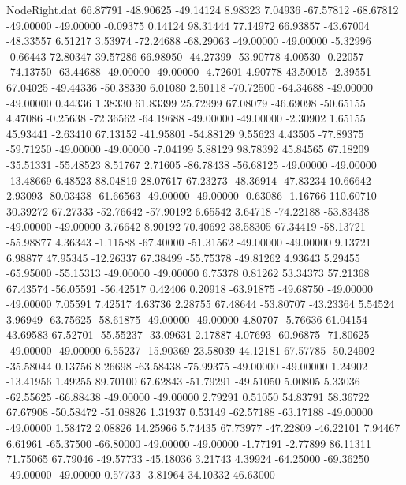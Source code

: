 \begin{filecontents}{NodeRight.dat}
  66.87791  -48.90625  -49.14124     8.98323    7.04936  -67.57812  -68.67812  -49.00000  -49.00000   -0.09375    0.14124   98.31444   77.14972
  66.93857  -43.67004  -48.33557     6.51217    3.53974  -72.24688  -68.29063  -49.00000  -49.00000   -5.32996   -0.66443   72.80347   39.57286
  66.98950  -44.27399  -53.90778     4.00530   -0.22057  -74.13750  -63.44688  -49.00000  -49.00000   -4.72601    4.90778   43.50015   -2.39551
  67.04025  -49.44336  -50.38330     6.01080    2.50118  -70.72500  -64.34688  -49.00000  -49.00000    0.44336    1.38330   61.83399   25.72999
  67.08079  -46.69098  -50.65155     4.47086   -0.25638  -72.36562  -64.19688  -49.00000  -49.00000   -2.30902    1.65155   45.93441   -2.63410
  67.13152  -41.95801  -54.88129     9.55623    4.43505  -77.89375  -59.71250  -49.00000  -49.00000   -7.04199    5.88129   98.78392   45.84565
  67.18209  -35.51331  -55.48523     8.51767    2.71605  -86.78438  -56.68125  -49.00000  -49.00000  -13.48669    6.48523   88.04819   28.07617
  67.23273  -48.36914  -47.83234    10.66642    2.93093  -80.03438  -61.66563  -49.00000  -49.00000   -0.63086   -1.16766  110.60710   30.39272
  67.27333  -52.76642  -57.90192     6.65542    3.64718  -74.22188  -53.83438  -49.00000  -49.00000    3.76642    8.90192   70.40692   38.58305
  67.34419  -58.13721  -55.98877     4.36343   -1.11588  -67.40000  -51.31562  -49.00000  -49.00000    9.13721    6.98877   47.95345  -12.26337
  67.38499  -55.75378  -49.81262     4.93643    5.29455  -65.95000  -55.15313  -49.00000  -49.00000    6.75378    0.81262   53.34373   57.21368
  67.43574  -56.05591  -56.42517     0.42406    0.20918  -63.91875  -49.68750  -49.00000  -49.00000    7.05591    7.42517    4.63736    2.28755
  67.48644  -53.80707  -43.23364     5.54524    3.96949  -63.75625  -58.61875  -49.00000  -49.00000    4.80707   -5.76636   61.04154   43.69583
  67.52701  -55.55237  -33.09631     2.17887    4.07693  -60.96875  -71.80625  -49.00000  -49.00000    6.55237  -15.90369   23.58039   44.12181
  67.57785  -50.24902  -35.58044     0.13756    8.26698  -63.58438  -75.99375  -49.00000  -49.00000    1.24902  -13.41956    1.49255   89.70100
  67.62843  -51.79291  -49.51050     5.00805    5.33036  -62.55625  -66.88438  -49.00000  -49.00000    2.79291    0.51050   54.83791   58.36722
  67.67908  -50.58472  -51.08826     1.31937    0.53149  -62.57188  -63.17188  -49.00000  -49.00000    1.58472    2.08826   14.25966    5.74435
  67.73977  -47.22809  -46.22101     7.94467    6.61961  -65.37500  -66.80000  -49.00000  -49.00000   -1.77191   -2.77899   86.11311   71.75065
  67.79046  -49.57733  -45.18036     3.21743    4.39924  -64.25000  -69.36250  -49.00000  -49.00000    0.57733   -3.81964   34.10332   46.63000

\end{filecontents}
